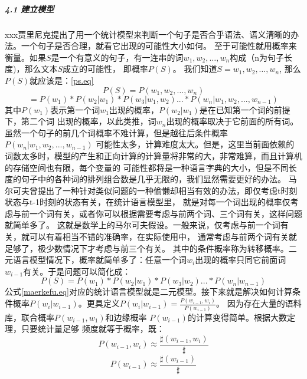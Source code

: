 \documentclass[12pt,a4paper,fancyhdr,openany,oneside]{ctexbook}
\begin{document}
\subparagraph{4.1 建立模型}
xxx贾里尼克提出了用一个统计模型来判断一个句子是否合乎语法、语义清晰的办法。一个句子是否合理，就看它出现的可能性大小如何。
至于可能性就用概率来衡量。如果$S$是一个有意义的句子，有一连串的词$w_1,w_2,…,w_n$构成（n为句子长度)，那么文本$S$成立的可能性，
即概率$P\left ( S \right )$。
我们知道$S=w_1,w_2,…,w_n$, 那么$P\left ( S \right )$就应该是：\ref{ps.eq}
\begin{displaymath}
    P\left ( S \right ) = P\left ( w_1,w_2,…,w_n \right ) 
\end{displaymath}
\begin{equation} \label{ps.eq}
    = P\left ( w_1 \right ) * P\left ( w_2|w_1 \right ) * P\left ( w_3|w_1, w_2\right ) ...
    *P\left ( w_n|w_1, w_2,...,w_{n-1}\right )
\end{equation}
其中$P\left ( w_1 \right )$表示第一个词$w_1$出现的概率，$P\left ( w_2|w_1 \right ) $是在已知第一个词的前提下，第二个词
出现的概率，以此类推，词$w_n$出现的概率取决于它前面的所有词。虽然一个句子的前几个词概率不难计算，但是越往后条件概率$P\left ( w_n|w_1, w_2,...,w_{n-1}\right )$
可能性太多，计算难度太大。但是，这里当前面依赖的词数太多时，模型的产生和正向计算的计算量将非常的大，非常难算，而且计算机的存储空间也有限，每个变量的
可能性都将是一种语言字典的大小，但是不同长度的句子中的各种词的排列组合数是几乎无限的，我们显然需要更好的办法。
马尔可夫曾提出了一种针对类似问题的一种偷懒却相当有效的办法，即仅考虑t时刻状态与t-1时刻的状态有关，在统计语言模型里，
就是对每一个词出现的概率仅考虑与前一个词有关，或者你可以根据需要考虑与前两个词、三个词有关，这样问题就简单多了。
这就是数学上的马尔可夫假设。一般来说，仅考虑与前一个词有关，就可以有着相当不错的准确率，在实际使用中，
通常考虑与前两个词有关就足够了，极少数情况下才考虑与前三个有关。
其中的条件概率称为转移概率。二元语言模型情况下，概率就简单多了：任意一个词$w_i$出现的概率只同它前面词$w_{i-1}$有关。于是问题可以简化成：
\begin{equation} \label{maerkefu.eq}
    P\left ( S \right )= P\left ( w_1 \right ) * P\left ( w_2|w_1 \right ) * P\left ( w_3|w_2\right ) ...
    *P\left ( w_n|w_{n-1}\right )
\end{equation}
公式\ref{maerkefu.eq}对应的统计语言模型就是二元模型。接下来就是解决如何计算条件概率$P\left ( w_i|w_{i-1}\right )$。更具定义$P\left ( w_i|w_{i-1}\right ) = \frac{P\left ( w_{i-1},w_i\right )}{P\left ( w_{i-1}\right )} $。
因为存在大量的语料库，联合概率$P\left ( w_{i-1},w_1\right )$和边缘概率 $P\left ( w_{i-1}\right )$的计算变得简单。根据大数定理，只要统计量足够
频度就等于概率，既：
\begin{equation} \label{pwi}
    P\left ( w_{i-1},w_i\right ) \approx  \frac{\sharp \left ( w_{i-1},w_i\right )}{\sharp} 
\end{equation}
\begin{equation}\label{pwi-1}
    P\left ( w_{i-1}\right ) \approx  \frac{\sharp \left ( w_{i-1}\right )}{\sharp} 
\end{equation}
\end{document}
